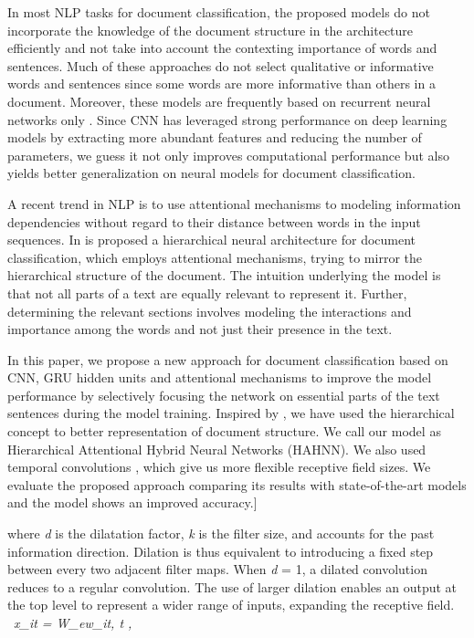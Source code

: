 \documentclass[runningheads]{llncs}
\begin{document}
In most NLP tasks for document classification, the proposed models do not incorporate the knowledge of the document structure in the architecture efficiently and not take into account the contexting importance of words and sentences. Much of these approaches do not select qualitative or informative words and sentences since some words are more informative than others in a document. Moreover, these models are frequently based on recurrent neural networks only \cite{c1}. Since CNN has leveraged strong performance on deep learning models by extracting more abundant features and reducing the number of parameters, we guess it not only improves computational performance but also yields better generalization on neural models for document classification.

A recent trend in NLP is to use attentional mechanisms to modeling information dependencies without regard to their distance between words in the input sequences. In \cite{c1} is proposed a hierarchical neural architecture for document classification, which employs attentional mechanisms, trying to mirror the hierarchical structure of the document. The intuition underlying the model is that not all parts of a text are equally relevant to represent it. Further, determining the relevant sections involves modeling the interactions and importance among the words and not just their presence in the text.



In this paper, we propose a new approach for document classification based on CNN, GRU \cite{c12} hidden units and attentional mechanisms to improve the model performance by selectively focusing the network on essential parts of the text sentences during the model training. Inspired by \cite{c1}, we have used the hierarchical concept to better representation of document structure. We call our model as Hierarchical Attentional Hybrid Neural Networks (HAHNN). We also used temporal convolutions \cite{c6}, which give us more flexible receptive field sizes. We evaluate the proposed approach comparing its results with state-of-the-art models and the model shows an improved accuracy.\-8mm]



\vspace{-1mm}

where \textit{d} is the dilatation factor, \textit{k} is the filter size, and  accounts for the past information direction. Dilation is thus equivalent to introducing a fixed step between every two adjacent filter maps. When \textit{d} = 1, a dilated convolution reduces to a regular convolution. The use of larger dilation enables an output at the top level to represent a wider range of inputs, expanding the receptive field. \
        \it{x_{it}} = W_ew_{it}, t \in [1,T], 
    
\end{document}
